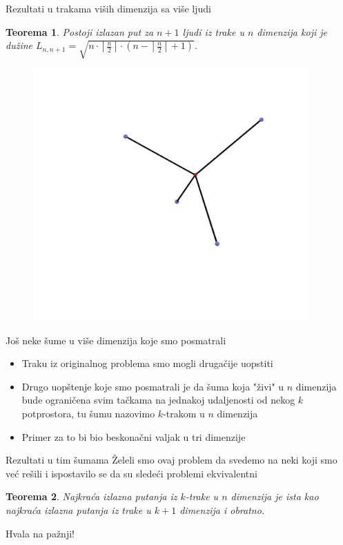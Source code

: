 \documentclass[12pt]{beamer}
\newtheorem{thm}{Teorema}[section]
\theoremstyle{definition}
\theoremstyle{remark}
\theoremstyle{plain}
\begin{document}
\begin{frame}{Rezultati u trakama vi\v sih dimenzija sa vi\v se ljudi}
\begin{thm}
Postoji izlazan put za $n+1$ ljudi iz trake u $n$ dimenzija koji je du\v zine $L_{n,n+1}=\sqrt{n\cdot\left\lceil\frac{n}{2}\right\rceil\cdot\left( n-\left\lceil\frac{n}{2}\right\rceil+1\right)}$.
\end{thm}
\begin{figure}
\begin{center}
\includegraphics[width=300pt]{cetiri.png}
\end{center}
\end{figure}
\end{frame}

\begin{frame}{Jo\v s neke \v sume u vi\v se dimenzija koje smo posmatrali}
\begin{itemize}
\item Traku iz originalnog problema smo mogli druga\v cije uopstiti
\pause
\item Drugo uop\v stenje koje smo posmatrali je da \v suma koja "\v zivi" u $n$ dimenzija bude ograni\v cena svim ta\v ckama na jednakoj udaljenosti od nekog $k$ potprostora, tu \v sumu nazovimo $k$-trakom u $n$ dimenzija
\pause
\item Primer za to bi bio beskona\v cni valjak u tri dimenzije 
\end{itemize}
\end{frame}

\begin{frame}{Rezultati u tim \v sumama}
\v Zeleli smo ovaj problem da svedemo na neki koji smo ve\' c re\v sili i ispostavilo se da su slede\' ci problemi ekvivalentni
\bigskip
\begin{thm}
Najkra\' ca izlazna putanja iz $k$-trake u $n$ dimenzija je ista kao najkra\' ca izlazna putanja iz trake u $k+1$ dimenzija i obratno.
\end{thm}
\end{frame}

\begin{frame}
\huge {Hvala na pa\v znji!}
\end{frame}

\end{document}
